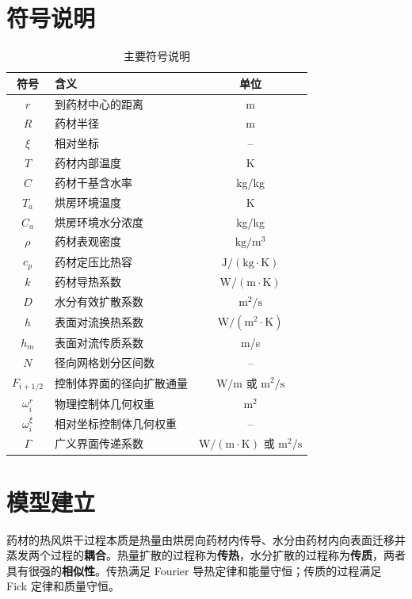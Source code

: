\documentclass[12pt,a4paper,fontset=none]{ctexart}
\begin{document}
\section{符号说明}
\begin{table}[H]
\centering
\caption{主要符号说明}\label{tab:symbols}
\small
\renewcommand{\arraystretch}{1.1}
\begin{tabularx}{0.92\textwidth}{c<{\centering}X<{\raggedright}c<{\centering}}
\toprule
符号 & 含义 & 单位\\
\midrule
$r$ & 到药材中心的距离 & m\\
$R$ & 药材半径 & m\\
$\xi$ & 相对坐标 & --\\
$T$ & 药材内部温度 & K\\
$C$ & 药材干基含水率 & kg/kg\\
$T_a$ & 烘房环境温度 & K\\
$C_a$ & 烘房环境水分浓度 & kg/kg\\
$\rho$ & 药材表观密度 & $\mathrm{kg/m^3}$\\
$c_p$ & 药材定压比热容 & $\mathrm{J/(kg\cdot K)}$\\
$k$ & 药材导热系数 & $\mathrm{W/(m\cdot K)}$\\
$D$ & 水分有效扩散系数 & $\mathrm{m^2/s}$\\
$h$ & 表面对流换热系数 & $\mathrm{W/(m^2\cdot K)}$\\
$h_m$ & 表面对流传质系数 & m/s\\
$N$ & 径向网格划分区间数 & --\\
$F_{i+1/2}$ & 控制体界面的径向扩散通量 & $\mathrm{W/m}$ 或 $\mathrm{m^2/s}$\\
$\omega_i^r$ & 物理控制体几何权重 & $\mathrm{m^2}$\\
$\omega_i^\xi$ & 相对坐标控制体几何权重 & --\\
$\Gamma$ & 广义界面传递系数 & $\mathrm{W/(m\cdot K)}$ 或 $\mathrm{m^2/s}$\\
\bottomrule
\end{tabularx}
\end{table}

\section{模型建立}
药材的热风烘干过程本质是热量由烘房向药材内传导、水分由药材内向表面迁移并蒸发两个过程的\textbf{耦合}。热量扩散的过程称为\textbf{传热}，水分扩散的过程称为\textbf{传质}，两者具有很强的\textbf{相似性}。传热满足 Fourier 导热定律和能量守恒；传质的过程满足 Fick 定律和质量守恒。
\end{document}
